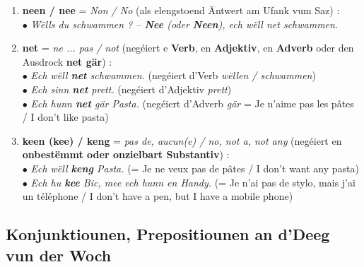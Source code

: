 \begin{enumerate}
    \item \textbf{neen / nee} = \textit{Non / No} (als elengstoend Äntwert am Ufank vum Saz) : \\
    $\bullet$ \textit{Wëlls du schwammen ? -- \textbf{Nee} (oder \textbf{Neen}), ech wëll net schwammen.}
    \item \textbf{net} = \textit{ne ... pas / not} (negéiert e \textbf{Verb}, en \textbf{Adjektiv}, en \textbf{Adverb} oder den Ausdrock \textbf{net gär}) : \\
    $\bullet$ \textit{Ech wëll \textbf{net} schwammen.} (negéiert d'Verb \textit{wëllen / schwammen}) \\
    $\bullet$ \textit{Ech sinn \textbf{net} prett.} (negéiert d'Adjektiv \textit{prett}) \\
    $\bullet$ \textit{Ech hunn \textbf{net} gär Pasta.} (negéiert d'Adverb \textit{gär} = Je n'aime pas les pâtes / I don't like pasta)
    \item \textbf{keen (kee) / keng} = \textit{pas de, aucun(e) / no, not a, not any} (negéiert en \textbf{onbestëmmt oder onzielbart Substantiv}) : \\
    $\bullet$ \textit{Ech wëll \textbf{keng} Pasta.} (= Je ne veux pas de pâtes / I don't want any pasta) \\
    $\bullet$ \textit{Ech hu \textbf{kee} Bic, mee ech hunn en Handy.} (= Je n'ai pas de stylo, mais j'ai un téléphone / I don't have a pen, but I have a mobile phone)
\end{enumerate}

\subsection{Konjunktiounen, Prepositiounen an d'Deeg vun der Woch}

